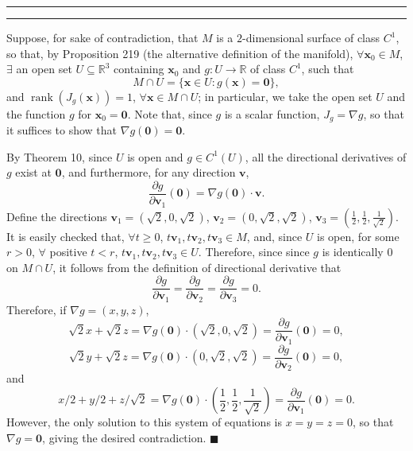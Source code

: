 \documentclass[11pt]{article}
\newcounter{questionCounter}
\newcounter{partCounter}[questionCounter]
\newenvironment{question}[2][\arabic{questionCounter}]{%
    \setcounter{partCounter}{0}%
    \vspace{.25in} \hrule \vspace{0.5em}%
        \noindent{\bf #2}%
    \vspace{0.8em} \hrule \vspace{.10in}%
    \addtocounter{questionCounter}{1}%
}{}
\renewcommand{\qed}{\quad $\blacksquare$}
\newcommand{\rank}{\operatorname{rank}}
\newcommand{\bzero}{\mathbf{0}}
\newcommand{\bv}{\mathbf{v}}
\newcommand{\bx}{\mathbf{x}}
\begin{document}
\begin{question}{Problem 4}
Suppose, for sake of contradiction, that $M$ is a $2$-dimensional surface of
class $C^1$, so that, by Proposition 219 (the alternative definition of the
manifold), $\forall \bx_0 \in M$, $\exists$ an open set
$U \subseteq \mathbb{R}^3$ containing $\bx_0$ and
$g: U \rightarrow \mathbb{R}$ of class $C^1$, such that
\[M \cap U = \{\bx \in U : g(\bx) = \bzero\},\] and
$\rank (J_g(\bx)) = 1$, $\forall \bx \in M \cap U$; in particular, we
take the open set $U$ and the function $g$ for $\bx_0 = \bzero$.
Note that, since $g$ is a scalar function, $J_g = \nabla g$, so that it
suffices to show that $\nabla g(\bzero) = \bzero$.

By Theorem 10, since $U$ is open and $g \in C^1(U)$, all the directional
derivatives of $g$ exist at $\bzero$, and furthermore, for any direction
$\bv$,
\[\frac{\partial g}{\partial \bv_1}(\bzero)
 = \nabla g(\bzero)\cdot\bv
.\]
Define the directions $\bv_1 = (\sqrt2,0,\sqrt2)$,
$\bv_2 = (0,\sqrt2,\sqrt2)$,
$\bv_3 = (\frac12,\frac12,\frac{1}{\sqrt2})$. It is easily checked that,
$\forall t \geq 0$, $t\bv_1,t\bv_2,t\bv_3 \in M$, and, since $U$ is open, for
some $r > 0$, $\forall$ positive $t < r$, $t\bv_1,t\bv_2,t\bv_3 \in U$.
Therefore, since since $g$ is identically $0$ on $M \cap U$, it follows from
the definition of directional derivative that
\[\frac{\partial g}{\partial \bv_1}
= \frac{\partial g}{\partial \bv_2}
= \frac{\partial g}{\partial \bv_3} = 0.\]
Therefore, if $\nabla g = (x,y,z)$,
\[\sqrt2x + \sqrt2z
 = \nabla g(\bzero) \cdot (\sqrt2,0,\sqrt2)
 = \frac{\partial g}{\partial \bv_1}(\bzero) = 0,\]
\[\sqrt2y + \sqrt2z
 = \nabla g(\bzero) \cdot (0,\sqrt2,\sqrt2)
 = \frac{\partial g}{\partial \bv_2}(\bzero) = 0,\]
and
\[x/2 + y/2 + z/\sqrt2
 = \nabla g(\bzero) \cdot (\frac12,\frac12,\frac{1}{\sqrt2})
 = \frac{\partial g}{\partial \bv_1}(\bzero) = 0.\]
However, the only solution to this system of equations is $x = y = z = 0$,
so that $\nabla g = \bzero$, giving the desired contradiction. \qed
\end{question}
\end{document}
